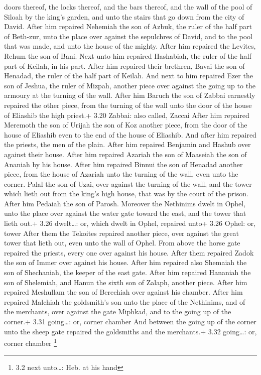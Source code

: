 doors thereof, the locks thereof, and the bars thereof, and the wall of
the pool of Siloah by the king's garden, and unto the stairs that go
down from the city of David.  After him repaired Nehemiah
the son of Azbuk, the ruler of the half part of Beth-zur, unto the place
over against the sepulchres of David, and to the pool that was made, and
unto the house of the mighty.  After him repaired the
Levites, Rehum the son of Bani. Next unto him repaired Hashabiah, the
ruler of the half part of Keilah, in his part.  After him
repaired their brethren, Bavai the son of Henadad, the ruler of the half
part of Keilah.  And next to him repaired Ezer the son of
Jeshua, the ruler of Mizpah, another piece over against the going up to
the armoury at the turning of the wall.  After him Baruch
the son of Zabbai earnestly repaired the other piece, from the turning
of the wall unto the door of the house of Eliashib the high priest.+
3.20 Zabbai: also called, Zaccai  After him repaired
Meremoth the son of Urijah the son of Koz another piece, from the door
of the house of Eliashib even to the end of the house of Eliashib.
 And after him repaired the priests, the men of the plain.
 After him repaired Benjamin and Hashub over against their
house. After him repaired Azariah the son of Maaseiah the son of Ananiah
by his house.  After him repaired Binnui the son of Henadad
another piece, from the house of Azariah unto the turning of the wall,
even unto the corner.  Palal the son of Uzai, over against
the turning of the wall, and the tower which lieth out from the king's
high house, that was by the court of the prison. After him Pedaiah the
son of Parosh.  Moreover the Nethinims dwelt in Ophel, unto
the place over against the water gate toward the east, and the tower
that lieth out.+ 3.26 dwelt\ldots: or, which dwelt in Ophel, repaired
unto+ 3.26 Ophel: or, tower  After them the Tekoites
repaired another piece, over against the great tower that lieth out,
even unto the wall of Ophel.  From above the horse gate
repaired the priests, every one over against his house. 
After them repaired Zadok the son of Immer over against his house. After
him repaired also Shemaiah the son of Shechaniah, the keeper of the east
gate.  After him repaired Hananiah the son of Shelemiah,
and Hanun the sixth son of Zalaph, another piece. After him repaired
Meshullam the son of Berechiah over against his chamber. 
After him repaired Malchiah the goldsmith's son unto the place of the
Nethinims, and of the merchants, over against the gate Miphkad, and to
the going up of the corner.+ 3.31 going\ldots: or, corner chamber
 And between the going up of the corner unto the sheep gate
repaired the goldsmiths and the merchants.+ 3.32 going\ldots: or, corner
chamber \footnote{3.2 next unto\ldots: Heb. at his hand}

